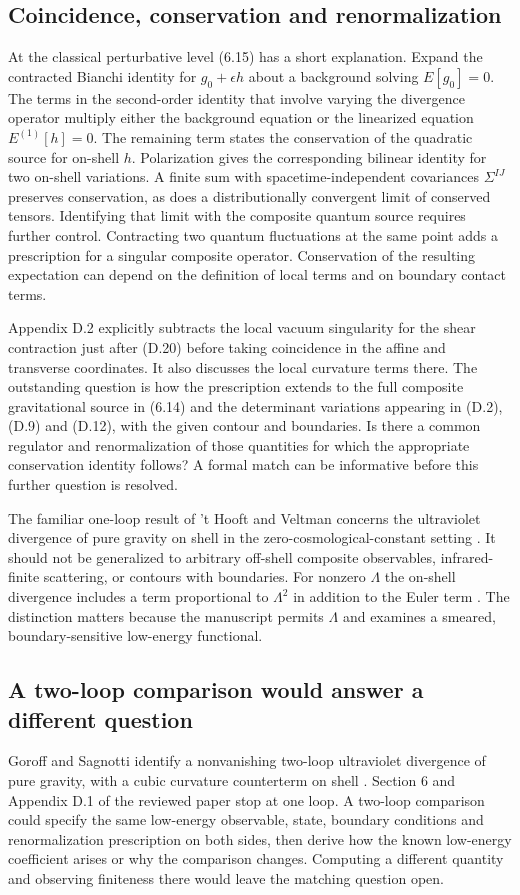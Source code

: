 \documentclass[11pt]{article}
\begin{document}
\subsection{Coincidence, conservation and renormalization}
At the classical perturbative level (6.15) has a short explanation. Expand the contracted Bianchi identity for $g_0+\epsilon h$ about a background solving $E[g_0]=0$. The terms in the second-order identity that involve varying the divergence operator multiply either the background equation or the linearized equation $E^{(1)}[h]=0$. The remaining term states the conservation of the quadratic source for on-shell $h$. Polarization gives the corresponding bilinear identity for two on-shell variations. A finite sum with spacetime-independent covariances $\Sigma^{IJ}$ preserves conservation, as does a distributionally convergent limit of conserved tensors. Identifying that limit with the composite quantum source requires further control. Contracting two quantum fluctuations at the same point adds a prescription for a singular composite operator. Conservation of the resulting expectation can depend on the definition of local terms and on boundary contact terms.

Appendix D.2 explicitly subtracts the local vacuum singularity for the shear contraction just after (D.20) before taking coincidence in the affine and transverse coordinates. It also discusses the local curvature terms there. The outstanding question is how the prescription extends to the full composite gravitational source in (6.14) and the determinant variations appearing in (D.2), (D.9) and (D.12), with the given contour and boundaries. Is there a common regulator and renormalization of those quantities for which the appropriate conservation identity follows? A formal match can be informative before this further question is resolved.

The familiar one-loop result of 't Hooft and Veltman concerns the ultraviolet divergence of pure gravity on shell in the zero-cosmological-constant setting \cite{thv}. It should not be generalized to arbitrary off-shell composite observables, infrared-finite scattering, or contours with boundaries. For nonzero $\Lambda$ the on-shell divergence includes a term proportional to $\Lambda^2$ in addition to the Euler term \cite{bps}. The distinction matters because the manuscript permits $\Lambda$ and examines a smeared, boundary-sensitive low-energy functional. 

\subsection{A two-loop comparison would answer a different question}
Goroff and Sagnotti identify a nonvanishing two-loop ultraviolet divergence of pure gravity, with a cubic curvature counterterm on shell \cite{gs}. Section 6 and Appendix D.1 of the reviewed paper stop at one loop. A two-loop comparison could specify the same low-energy observable, state, boundary conditions and renormalization prescription on both sides, then derive how the known low-energy coefficient arises or why the comparison changes. Computing a different quantity and observing finiteness there would leave the matching question open.
\end{document}
